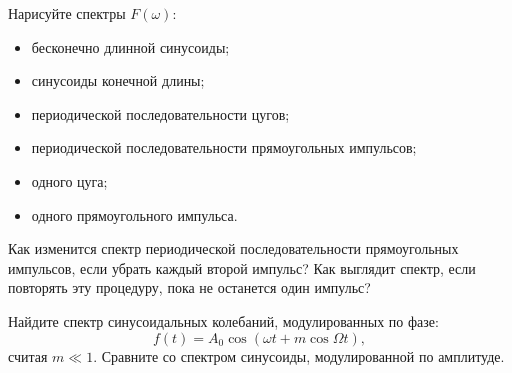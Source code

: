 \begin{lab:questions}

\item Нарисуйте спектры $F(\omega)$:
\begin{itemize}
	\item бесконечно длинной синусоиды;
	\item синусоиды конечной длины;
	\item периодической последовательности цугов;
	\item периодической последовательности прямоугольных импульсов;
	\item одного цуга;
	\item одного прямоугольного импульса.
\end{itemize}
\item Как изменится спектр периодической последовательности прямоугольных импульсов, если убрать каждый второй импульс? Как
выглядит спектр, если повторять эту процедуру, пока не останется один импульс?


\item Найдите спектр синусоидальных колебаний, модулированных по фазе:
\begin{equation*}
	f(t)=A_0\cos(\omega t + m \cos \Omega t),
\end{equation*}
%
считая $m\ll 1$. Сравните со спектром синусоиды, модулированной по амплитуде.

\end{lab:questions}




